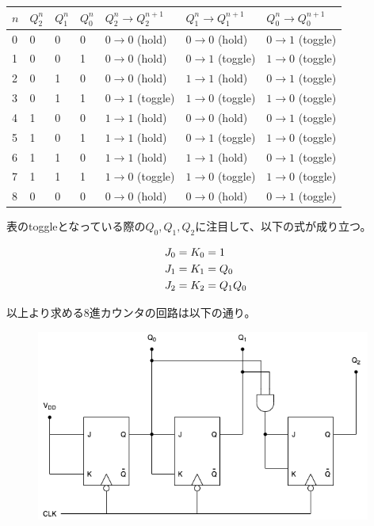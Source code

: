 \documentclass[a4paper,12pt,xelatex,ja=standard]{bxjsarticle}
\begin{document}
\begin{table}[H]
  \centering
  \begin{tabular}{|l|l|l|l|l|l|l|}
  \hline
  $n$ & $Q^n_2$ & $Q^n_1$ & $Q^n_0$ & $Q^n_2 \to Q^{n+1}_2$ & $Q^n_1 \to Q^{n+1}_1$ & $Q^n_0 \to Q^{n+1}_0$ \\ \hline \hline
  0 & 0 & 0 & 0 & $0 \to 0$ (hold)   & $0 \to 0$ (hold)   & $0 \to 1$ (toggle) \\ \hline
  1 & 0 & 0 & 1 & $0 \to 0$ (hold)   & $0 \to 1$ (toggle) & $1 \to 0$ (toggle) \\ \hline
  2 & 0 & 1 & 0 & $0 \to 0$ (hold)   & $1 \to 1$ (hold)   & $0 \to 1$ (toggle) \\ \hline
  3 & 0 & 1 & 1 & $0 \to 1$ (toggle) & $1 \to 0$ (toggle) & $1 \to 0$ (toggle) \\ \hline
  4 & 1 & 0 & 0 & $1 \to 1$ (hold)   & $0 \to 0$ (hold)   & $0 \to 1$ (toggle) \\ \hline
  5 & 1 & 0 & 1 & $1 \to 1$ (hold)   & $0 \to 1$ (toggle) & $1 \to 0$ (toggle) \\ \hline
  6 & 1 & 1 & 0 & $1 \to 1$ (hold)   & $1 \to 1$ (hold)   & $0 \to 1$ (toggle) \\ \hline
  7 & 1 & 1 & 1 & $1 \to 0$ (toggle) & $1 \to 0$ (toggle) & $1 \to 0$ (toggle) \\ \hline
  8 & 0 & 0 & 0 & $0 \to 0$ (hold)   & $0 \to 0$ (hold)   & $0 \to 1$ (toggle) \\ \hline
  \end{tabular}
\end{table}

表のtoggleとなっている際の$Q_0, Q_1, Q_2$に注目して、以下の式が成り立つ。

\begin{equation*}
  \centering
  \begin{split}
    &J_0 = K_0 = 1 \\
    &J_1 = K_1 = Q_0 \\
    &J_2 = K_2 = Q_1 Q_0
  \end{split}
\end{equation*}

以上より求める8進カウンタの回路は以下の通り。

\begin{figure}[H]
  \centering
  \includegraphics[width=11cm]{images/8_counter.png}
\end{figure}
\end{document}
